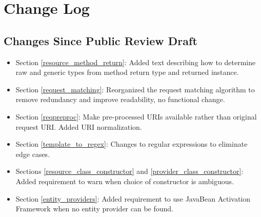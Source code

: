 \chapter{Change Log}

\section{Changes Since Public Review Draft}

\begin{itemize}
\item Section \ref{resource_method_return}: Added text describing how to determine raw and generic types from method return type and returned instance.
\item Section \ref{request_matching}: Reorganized the request matching algorithm to remove redundancy and improve readability, no functional change.
\item Section \ref{reqpreproc}: Make pre-processed URIs available rather than original request URI. Added URI normalization.
\item Section \ref{template_to_regex}: Changes to regular expressions to eliminate edge cases.
\item Sections \ref{resource_class_constructor} and \ref{provider_class_constructor}: Added requirement to warn when choice of constructor is ambiguous.
\item Section \ref{entity_providers}: Added requirement to use JavaBean Activation Framework when no entity provider can be found.
\end{itemize}